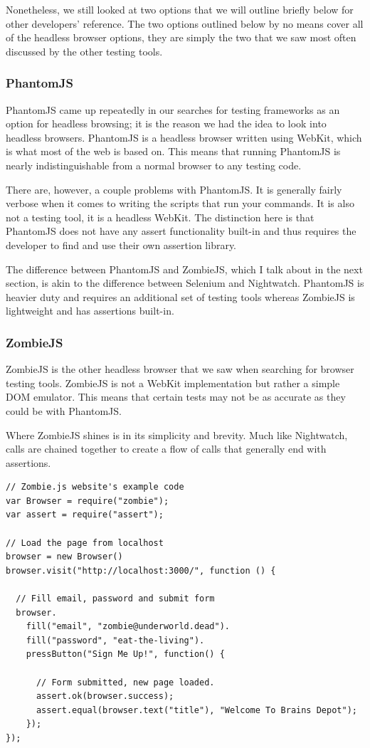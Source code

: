\documentclass[12pt]{ucthesis}
\begin{document}
Nonetheless, we still looked at two options that we will outline briefly below for other developers' reference. The two options outlined below by no means cover all of the headless browser options, they are simply the two that we saw most often discussed by the other testing tools.

\subsubsection{PhantomJS}
PhantomJS\cite{PhantomJS} came up repeatedly in our searches for testing frameworks as an option for headless browsing; it is the reason we had the idea to look into headless browsers. PhantomJS is a headless browser written using WebKit, which is what most of the web is based on. This means that running PhantomJS is nearly indistinguishable from a normal browser to any testing code.

There are, however, a couple problems with PhantomJS. It is generally fairly verbose when it comes to writing the scripts that run your commands. It is also not a testing tool, it is a headless WebKit. The distinction here is that PhantomJS does not have any assert functionality built-in and thus requires the developer to find and use their own assertion library.

The difference between PhantomJS and ZombieJS, which I talk about in the next section, is akin to the difference between Selenium and Nightwatch. PhantomJS is heavier duty and requires an additional set of testing tools whereas ZombieJS is lightweight and has assertions built-in.

\subsubsection{ZombieJS}
ZombieJS\cite{ZombieJS} is the other headless browser that we saw when searching for browser testing tools. ZombieJS is not a WebKit implementation but rather a simple DOM emulator. This means that certain tests may not be as accurate as they could be with PhantomJS.

Where ZombieJS shines is in its simplicity and brevity. Much like Nightwatch, calls are chained together to create a flow of calls that generally end with assertions.

\begin{lstlisting}
// Zombie.js website's example code
var Browser = require("zombie");
var assert = require("assert");

// Load the page from localhost
browser = new Browser()
browser.visit("http://localhost:3000/", function () {

  // Fill email, password and submit form
  browser.
    fill("email", "zombie@underworld.dead").
    fill("password", "eat-the-living").
    pressButton("Sign Me Up!", function() {

      // Form submitted, new page loaded.
      assert.ok(browser.success);
      assert.equal(browser.text("title"), "Welcome To Brains Depot");
    });
});
\end{lstlisting}
\end{document}
